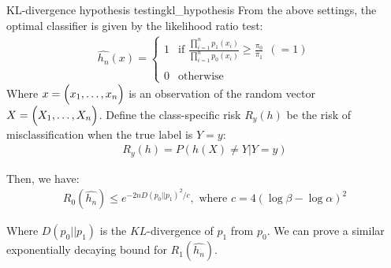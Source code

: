 \begin{proposition}{KL-divergence hypothesis testing}{kl_hypothesis}
    From the above settings, the optimal classifier is given by the likelihood ratio test:
    \begin{align*}
        \widehat{h_n}(x) = \begin{cases}
            1 &\text{if } \frac{\prod_{i=1}^n p_1(x_i)}{\prod_{i=1}^n p_0(x_i)} \ge \frac{\pi_0}{\pi_1} \ \ (=1)
            \\ \\
            0 &\text{otherwise}
        \end{cases}
    \end{align*}
    \noindent Where $x=\Big( x_1, \dots, x_n \Big)$ is an observation of the random vector $X=\Big( X_1, \dots, X_n \Big)$. Define the class-specific risk $R_y(h)$ be the risk of misclassification when the true label is $Y=y$:
    \begin{align*}
        R_y(h) = P(h(X) \ne Y|Y=y)
    \end{align*}

    \noindent Then, we have:
    \begin{align*}
        R_0(\widehat{h_n}) \le e^{-2n D(p_0||p_1)^2 / c}, \text{ where } c = 4(\log\beta - \log\alpha)^2
    \end{align*}

    \noindent Where $D(p_0||p_1)$ is the $KL$-divergence of $p_1$ from $p_0$. We can prove a similar exponentially decaying bound for $R_1(\widehat{h_n})$.
\end{proposition}

